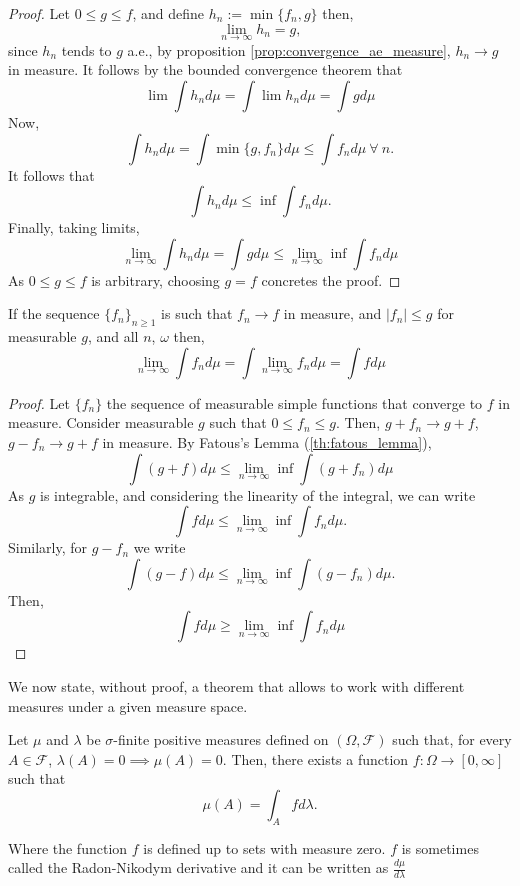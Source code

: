 \documentclass[../TGMAFFIRO.tex]{subfiles}
\begin{document}
\begin{proof}
	Let $0 \leq g \leq f$, and define $h_n:= \min\{f_n, g\}$ then,
	\[
		\lim_{n\to\infty} h_n = g,
	\]
	since $h_n$ tends to $g$ a.e., by proposition \ref{prop:convergence_ae_measure}, $h_n \to g$ in measure. It follows by the bounded convergence theorem that
	\begin{equation}
		\lim \int h_n d\mu = \int \lim h_n d\mu = \int g d\mu
	\end{equation}
	Now, 
	\[
		\int h_n d\mu = \int \min\{g, f_n\} d\mu \leq \int f_n d	\mu \ \forall \ n.
	\]
	It follows that
	\[
		\int h_n d\mu \leq \inf\int f_n d\mu.
	\]
	Finally, taking limits,
	\[
		\lim_{n\to\infty} \int h_n d\mu = \int g d\mu \leq \lim_{n\to\infty}\inf \int f_n d\mu
	\]
	As $0 \leq g \leq f$ is arbitrary, choosing $g = f$ concretes the proof.
\end{proof}

\begin{theorem}
If the sequence $\{f_n\}_{n\geq 1}$ is such that $f_n \to f$ in measure, and $|f_n| \leq g$ for measurable $g$, and all $n$, $\omega$ then,
\begin{equation}
	\lim_{n\to\infty}\int f_n d\mu = \int \lim_{n\to\infty} f_n d\mu  = \int f d\mu
\end{equation}
\end{theorem}

\begin{proof}
	Let $\{f_n\}$ the sequence of measurable simple functions that converge to $f$ in measure. Consider measurable $g$ such that $0 \leq f_n \leq g$. Then, $g + f_n \to g + f$, $g - f_n \to g + f$ in measure. By Fatous's Lemma (\ref	{th:fatous_lemma}),
	\[
		\int(g + f) d\mu \leq \lim_{n\to\infty}\inf\int(g + f_n) d\mu
	\]	
	As $g$ is integrable, and considering the linearity of the integral, we can write
	\[
		\int f d\mu \leq \lim_{n\to\infty}\inf\int f_n d\mu.
	\]
	Similarly, for $g - f_n$ we write
	\[
		\int(g - f) d\mu \leq \lim_{n\to\infty} \inf \int (g - f_n) d\mu.
	\]
	Then,
	\[
		\int f d\mu \geq \lim_{n\to\infty} \inf \int f_n d\mu
	\]
\end{proof}

We now state, without proof, a theorem that allows to work with different measures under a given measure space.

\begin{theorem}\label{th:radon-nikodym}
Let $\mu$ and $\lambda$ be $\sigma$-finite positive measures defined on $(\Omega, \mathscr{F})$ such that, for every $A \in \mathscr{F}$, $\lambda(A) = 0 \implies \mu(A)= 0$. Then, there exists a function $f: \Omega \to [0, \infty]$ such that
\[
	\mu(A) = \int_A f d\lambda.
\]

Where the function $f$ is defined up to sets with measure zero. $f$ is sometimes called the Radon-Nikodym derivative and it can be written as $\frac{d\mu}{d\lambda}$
\end{theorem}
\end{document}
